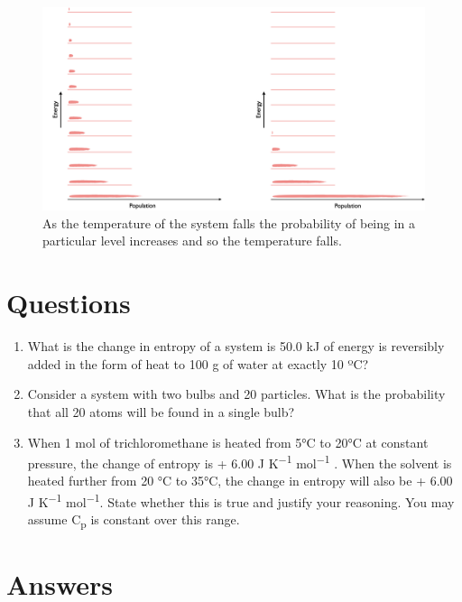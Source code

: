 \documentclass[
]{book}
\begin{document}
\begin{figure}

{\centering \includegraphics[width=0.8\linewidth]{images/tempentropy} 

}

\caption{As the temperature of the system falls the probability of being in a particular level increases and so the temperature falls.}\label{fig:tempentropy}
\end{figure}

\hypertarget{sec:w3p1question}{%
\section{Questions}\label{sec:w3p1question}}

\begin{enumerate}
\def\labelenumi{\arabic{enumi}.}
\item
  What is the change in entropy of a system is 50.0 kJ of energy is reversibly added in the form of heat to 100 g of water at exactly 10 ºC?
\item
  Consider a system with two bulbs and 20 particles. What is the probability that all 20 atoms will be found in a single bulb?
\item
  When 1 mol of trichloromethane is heated from 5°C to 20°C at constant pressure, the
  change of entropy is + 6.00 J K\textsuperscript{−1} mol\textsuperscript{−1} . When the solvent is heated further from 20 °C to 35°C, the change in entropy will also be + 6.00 J K\textsuperscript{−1} mol\textsuperscript{−1}. State whether this is true and justify your reasoning. You may assume C\textsubscript{p} is constant over this range.
\end{enumerate}

\hypertarget{sec:w3p1ans}{%
\section{Answers}\label{sec:w3p1ans}}
\end{document}
